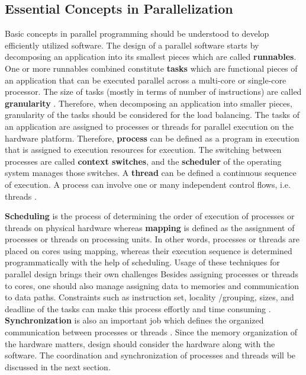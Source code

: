 \subsection{Essential Concepts in Parallelization} 
Basic concepts in parallel programming should be understood to develop efficiently utilized software. The design of a parallel software starts by decomposing an application into its smallest pieces which are called \textbf{runnables}. One or more runnables combined constitute \textbf{tasks} which are functional pieces of an application that can be executed parallel across a multi-core or single-core processor. The size of tasks (mostly in terms of number of instructions) are called \textbf{granularity} \cite{springerparallel}. Therefore, when decomposing an application into smaller pieces, granularity of the tasks should be considered for the load balancing. The tasks of an application are assigned to processes or threads for parallel execution on the hardware platform. Therefore, \textbf{process} can be defined as a program in execution that is assigned to execution resources for execution. The switching between processes are called \textbf{context switches}, and the \textbf{scheduler} of the operating system manages those switches. A \textbf{thread} can be defined a continuous sequence of execution. A process can involve one or many independent control flows, i.e. threads \cite{springerparallel}. 

\textbf{Scheduling} is the process of determining the order of execution of processes or threads on physical hardware whereas \textbf{mapping} is defined as the assignment of processes or threads on processing units. In other words, processes or threads are placed on cores using mapping, whereas their execution sequence is determined programmatically with the help of scheduling. Usage of these techniques for parallel design brings their own challenges Besides assigning processes or threads to cores, one should also manage assigning data to memories and communication to data paths. Constraints such as instruction set, locality /grouping,  sizes, and deadline of the tasks can make this process effortly and time consuming \cite{lukas1}. \textbf{Synchronization} is also an important job which defines the organized communication between processes or threads \cite{springerparallel}. Since the memory organization of the hardware matters, design should consider the hardware along with the software. The coordination and synchronization of processes and threads will be discussed in the next section.

